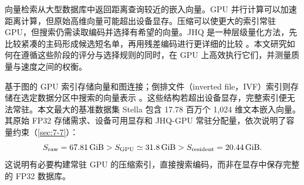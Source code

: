 向量检索从大型数据库中返回距离查询较近的嵌入向量。GPU 并行计算可以加速距离计算，但原始高维向量可能超出设备显存。压缩可以使更大的索引常驻 GPU，但搜索仍需读取编码并选择有希望的向量。JHQ 是一种层级量化方法，先比较紧凑的主码形成候选短名单，再用残差编码进行更详细的比较 \cite{jhq}。本文研究如何在遵循这些阶段的评分与选择规则的同时，在 GPU 上高效执行它们，并测量质量与速度之间的权衡。

基于图的 GPU 索引存储向量和图连接；倒排文件（inverted file，IVF）索引则存储在选定数据分区中搜索的向量表示 \cite{cagra,johnson_gpu,ivfrabitq}。这些结构若超出设备显存，完整索引便无法常驻。本文最大的基准数据集 Stella 包含 17.78 百万个 1,024 维文本嵌入向量。其原始 FP32 存储需求、设备可用显存和 JHQ-GPU 常驻分配量，依次说明了容量约束（\cref{sec:7-7}）：
\[
 S_{\rm raw}=67.81\,\mathrm{GiB}
 >S_{\rm GPU}\simeq31.8\,\mathrm{GiB}
 >S_{\rm resident}=20.44\,\mathrm{GiB}.
\]
这说明有必要构建常驻 GPU 的压缩索引，直接搜索编码，而非在显存中保存完整的 FP32 数据库。
